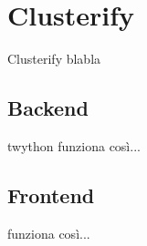 \chapter{Clusterify}
Clusterify blabla

\section{Backend}
	twython
	funziona così...

\section{Frontend}
	funziona così...